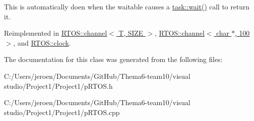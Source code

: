 This is automatically doen when the waitable causes a \hyperlink{class_r_t_o_s_1_1task_a6fc603d0f1c8a94813586d3dfd123fcc}{task\+::wait()} call to return it. 

Reimplemented in \hyperlink{class_r_t_o_s_1_1channel_afd8cd81a91225ed144fc1ca20f3cd8f6}{R\+T\+O\+S\+::channel$<$ T, S\+I\+Z\+E $>$}, \hyperlink{class_r_t_o_s_1_1channel_afd8cd81a91225ed144fc1ca20f3cd8f6}{R\+T\+O\+S\+::channel$<$ char $\ast$, 100 $>$}, and \hyperlink{class_r_t_o_s_1_1clock_a90d7c2b274fff1b43a1de08e742c41c3}{R\+T\+O\+S\+::clock}.



The documentation for this class was generated from the following files\+:\begin{DoxyCompactItemize}
\item 
C\+:/\+Users/jeroen/\+Documents/\+Git\+Hub/\+Thema6-\/team10/visual studio/\+Project1/\+Project1/p\+R\+T\+O\+S.\+h\item 
C\+:/\+Users/jeroen/\+Documents/\+Git\+Hub/\+Thema6-\/team10/visual studio/\+Project1/\+Project1/p\+R\+T\+O\+S.\+cpp\end{DoxyCompactItemize}
